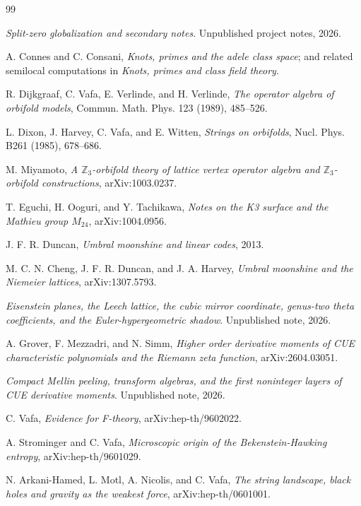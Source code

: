 \documentclass[11pt]{article}
\theoremstyle{remark}
\begin{document}
\begin{thebibliography}{99}

\textit{Split-zero globalization and secondary notes}.  Unpublished project notes, 2026.

A. Connes and C. Consani, \textit{Knots, primes and the adele class space}; and related semilocal computations in \textit{Knots, primes and class field theory}.

R. Dijkgraaf, C. Vafa, E. Verlinde, and H. Verlinde, \textit{The operator algebra of orbifold models}, Commun. Math. Phys. 123 (1989), 485--526.

L. Dixon, J. Harvey, C. Vafa, and E. Witten, \textit{Strings on orbifolds}, Nucl. Phys. B261 (1985), 678--686.

M. Miyamoto, \textit{A $\mathbb Z_3$-orbifold theory of lattice vertex operator algebra and $\mathbb Z_3$-orbifold constructions}, arXiv:1003.0237.

T. Eguchi, H. Ooguri, and Y. Tachikawa, \textit{Notes on the K3 surface and the Mathieu group $M_{24}$}, arXiv:1004.0956.

J. F. R. Duncan, \textit{Umbral moonshine and linear codes}, 2013.

M. C. N. Cheng, J. F. R. Duncan, and J. A. Harvey, \textit{Umbral moonshine and the Niemeier lattices}, arXiv:1307.5793.

\textit{Eisenstein planes, the Leech lattice, the cubic mirror coordinate, genus-two theta coefficients, and the Euler-hypergeometric shadow}.  Unpublished note, 2026.

A. Grover, F. Mezzadri, and N. Simm, \textit{Higher order derivative moments of CUE characteristic polynomials and the Riemann zeta function}, arXiv:2604.03051.

\textit{Compact Mellin peeling, transform algebras, and the first noninteger layers of CUE derivative moments}.  Unpublished note, 2026.

C. Vafa, \textit{Evidence for F-theory}, arXiv:hep-th/9602022.

A. Strominger and C. Vafa, \textit{Microscopic origin of the Bekenstein-Hawking entropy}, arXiv:hep-th/9601029.

N. Arkani-Hamed, L. Motl, A. Nicolis, and C. Vafa, \textit{The string landscape, black holes and gravity as the weakest force}, arXiv:hep-th/0601001.


\end{thebibliography}
\end{document}
